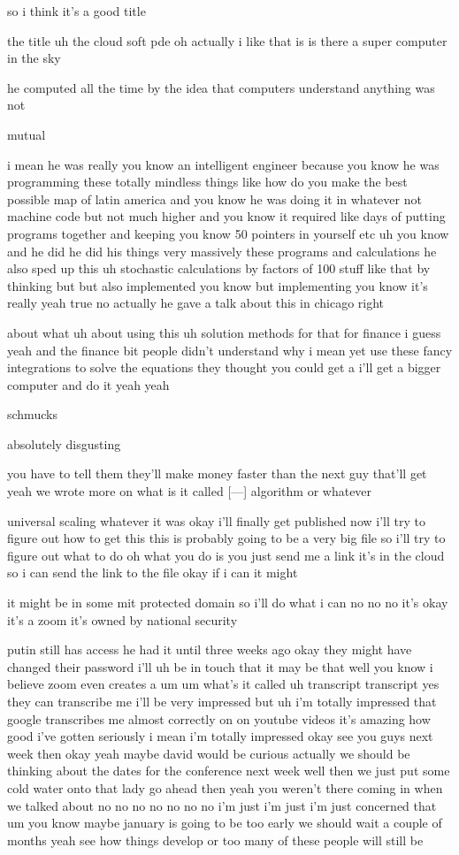 \begin{description}
so i think it's a good title

the title uh the cloud soft pde oh actually i like that is is there a super computer in the sky

he computed all the time by the idea that computers understand anything was not

mutual

i mean he was really you know an intelligent engineer because you know he was programming these totally mindless things like how do you make the best possible map of latin america and you know he was doing it in whatever not machine code but not much higher and you know it required like days of putting programs together and keeping you know 50 pointers in yourself etc uh you know and he did he did his things very massively these programs and calculations he also sped up this uh stochastic calculations by factors of 100 stuff like that by thinking but but also implemented you know but implementing you know it's really yeah true no actually he gave a talk about this in chicago right

about what uh about using this uh solution methods for that for finance i guess yeah and the finance bit people didn't understand why i mean yet use these fancy integrations to solve the equations they thought you could get a i'll get a bigger computer and do it yeah yeah

schmucks

absolutely disgusting

you have to tell them they'll make money faster than the next guy that'll get yeah we wrote more on what is it called [---] algorithm or whatever

universal scaling whatever it was okay i'll finally get published now i'll try to figure out how to get this this is probably going to be a very big file so i'll try to figure out what to do oh what you do is you just send me a link it's in the cloud so i can send the link to the file okay if i can it might

it might be in some mit protected domain so i'll do what i can no no no it's okay it's a zoom it's owned by national security

putin still has access he had it until three weeks ago okay they might have changed their password i'll uh be in touch that it may be that well you know i believe zoom even creates a um um what's it called uh transcript transcript yes they can transcribe me i'll be very impressed but uh i'm totally impressed that google transcribes me almost correctly on on youtube videos it's amazing how good i've gotten seriously i mean i'm totally impressed okay see you guys next week then okay yeah maybe david would be curious actually we should be thinking about the dates for the conference next week well then we just put some cold water onto that lady go ahead then yeah you weren't there coming in when we talked about no no no no no no no i'm just i'm just i'm just concerned that um you know maybe january is going to be too early we should wait a couple of months yeah see how things develop or too many of these people will still be


\end{description}
